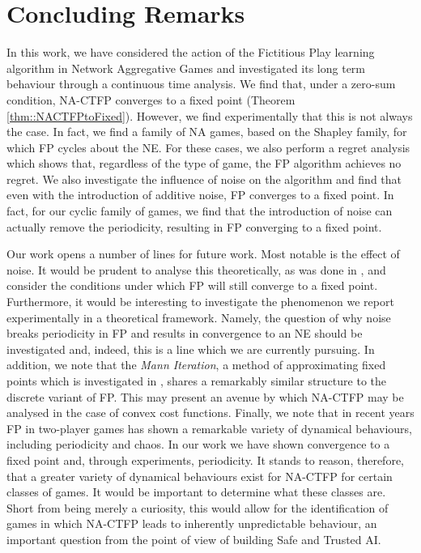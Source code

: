 \documentclass{article}
\theoremstyle{definition}
\begin{document}
\section{Concluding Remarks}
	In this work, we have considered the action of the Fictitious Play learning algorithm in Network Aggregative Games and investigated its long term behaviour through a continuous time analysis. We find that, under a zero-sum condition, NA-CTFP converges to a fixed point (Theorem \ref{thm::NACTFPtoFixed}). However, we find experimentally that this is not always the case. In fact, we find a family of NA games, based on the Shapley family, for which FP cycles about the NE. For these cases, we also perform a regret analysis which shows that, regardless of the type of game, the FP algorithm achieves no regret. 
%	
	We also investigate the influence of noise on the algorithm and find that even with the introduction of additive noise, FP converges to a fixed point. In fact, for our cyclic family of games, we find that the introduction of noise can actually remove the periodicity, resulting in FP converging to a fixed point.
	
	Our work opens a number of lines for future work. Most notable is the effect of noise. It would be prudent to analyse this theoretically, as was done in \cite{Perrin2020}, and consider the conditions under which FP will still converge to a fixed point. Furthermore, it would be interesting to investigate the phenomenon we report experimentally in a theoretical framework. Namely, the question of why noise breaks periodicity in FP and results in convergence to an NE should be investigated and, indeed, this is a line which we are currently pursuing.
%	
	In addition, we note that the \emph{Mann Iteration}, a method of approximating fixed points which is investigated in \cite{Parise2020}, shares a remarkably similar structure to the discrete variant of FP. This may present an avenue by which NA-CTFP may be analysed in the case of convex cost functions. 
%	
	Finally, we note that in recent years FP in two-player games has shown a remarkable variety of dynamical behaviours, including periodicity and chaos. In our work we have shown convergence to a fixed point and, through experiments, periodicity. It stands to reason, therefore, that a greater variety of dynamical behaviours exist for NA-CTFP for certain classes of games. It would be important to determine what these classes are. Short from being merely a curiosity, this would allow for the identification of games in which NA-CTFP leads to inherently unpredictable behaviour, an important question from the point of view of building Safe and Trusted AI.
\end{document}

